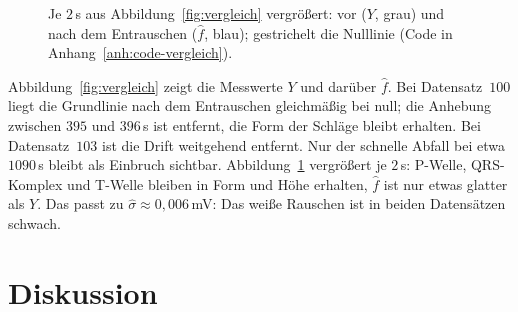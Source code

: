 \documentclass[a4paper,11pt,bibliography=totoc,listof=totoc,headinclude=true,cleardoublepage=empty,oneside]{scrbook}
\theoremstyle{plain}
\theoremstyle{definition}
\begin{document}
\begin{figure}[htbp]
  \centering
  \caption[Ausschnitte vor und nach dem Entrauschen, vergrö\ss ert]{Je
  $2$\,s aus Abbildung~\ref{fig:vergleich} vergrö\ss ert: vor ($Y$, grau) und
  nach dem Entrauschen ($\hat f$, blau); gestrichelt die Nulllinie (Code in
  Anhang~\ref{anh:code-vergleich}).}
  \label{fig:vergleich-zoom}
\end{figure}

Abbildung~\ref{fig:vergleich} zeigt die Messwerte $Y$ und darüber $\hat f$.
Bei Datensatz~$100$ liegt die Grundlinie nach dem Entrauschen
gleichmä\ss ig bei null; die Anhebung zwischen $395$ und $396$\,s ist
entfernt, die Form der Schläge bleibt erhalten. Bei Datensatz~$103$ ist die
Drift weitgehend entfernt. Nur der schnelle Abfall bei etwa $1090$\,s bleibt
als Einbruch sichtbar. Abbildung~\ref{fig:vergleich-zoom} vergrö\ss ert je
$2$\,s: P-Welle, QRS-Komplex und T-Welle bleiben in Form und Höhe erhalten,
$\hat f$ ist nur etwas glatter als $Y$. Das passt zu
$\hat\sigma \approx 0{,}006$\,mV: Das wei\ss e Rauschen ist in beiden
Datensätzen schwach.

\section{Diskussion}
\label{sec:diskussion}
\end{document}
